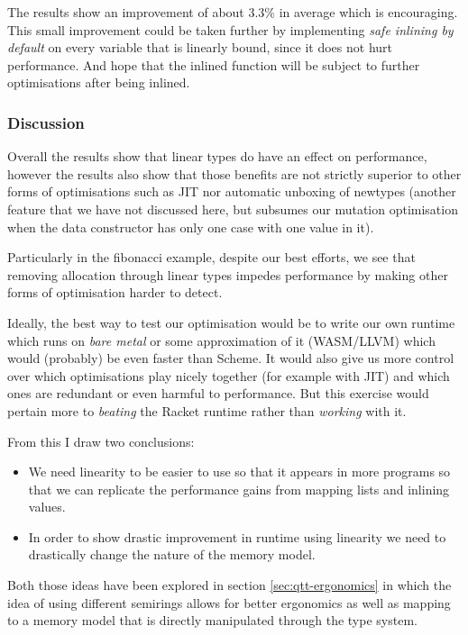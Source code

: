 \documentclass[
]{article}
\providecommand{\tightlist}{%
  \setlength{\itemsep}{0pt}\setlength{\parskip}{0pt}}
\begin{document}
The results show an improvement of about 3.3\% in average which is
encouraging. This small improvement could be taken further by
implementing \emph{safe inlining by default} on every variable that is
linearly bound, since it does not hurt performance. And hope that the
inlined function will be subject to further optimisations after being
inlined.

\hypertarget{discussion}{%
\subsubsection{Discussion}\label{discussion}}

\label{subsec:discussion}

Overall the results show that linear types do have an effect on
performance, however the results also show that those benefits are not
strictly superior to other forms of optimisations such as JIT nor
automatic unboxing of newtypes (another feature that we have not
discussed here, but subsumes our mutation optimisation when the data
constructor has only one case with one value in it).

Particularly in the fibonacci example, despite our best efforts, we see
that removing allocation through linear types impedes performance by
making other forms of optimisation harder to detect.

Ideally, the best way to test our optimisation would be to write our own
runtime which runs on \emph{bare metal} or some approximation of it
(WASM/LLVM) which would (probably) be even faster than Scheme. It would
also give us more control over which optimisations play nicely together
(for example with JIT) and which ones are redundant or even harmful to
performance. But this exercise would pertain more to \emph{beating} the
Racket runtime rather than \emph{working} with it.

From this I draw two conclusions:

\begin{itemize}
\tightlist
\item
  We need linearity to be easier to use so that it appears in more
  programs so that we can replicate the performance gains from mapping
  lists and inlining values.
\item
  In order to show drastic improvement in runtime using linearity we
  need to drastically change the nature of the memory model.
\end{itemize}

Both those ideas have been explored in section \ref{sec:qtt-ergonomics}
in which the idea of using different semirings allows for better
ergonomics as well as mapping to a memory model that is directly
manipulated through the type system.
\end{document}

